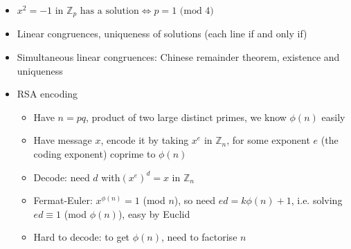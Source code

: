 \documentclass[12pt]{article}
\begin{document}
\begin{itemize}
\item $x^{2}=-1\textrm{ in }\mathbb{Z}_{p}\textrm{ has a solution}\iff p=1\textrm{ (mod }4)$
\item Linear congruences, uniqueness of solutions (each line if and only
if)
\item Simultaneous linear congruences: Chinese remainder theorem, existence
and uniqueness
\item RSA encoding
\begin{itemize}
\item Have $n=pq$, product of two large distinct primes, we know $\phi(n)$
easily
\item Have message $x$, encode it by taking $x^{e}$ in $\mathbb{Z}_{n}$,
for some exponent $e$ (the coding exponent) coprime to $\phi(n)$
\item Decode: need $d$ with$\left(x^{e}\right)^{d}=x$ in $\mathbb{Z}_{n}$
\item Fermat-Euler: $x^{\phi(n)}=1$ (mod $n$), so need $ed=k\phi(n)+1$,
i.e. solving $ed\equiv1$ (mod $\phi(n)$), easy by Euclid
\item Hard to decode: to get $\phi(n)$, need to factorise $n$
\end{itemize}
\end{itemize}
\end{document}
